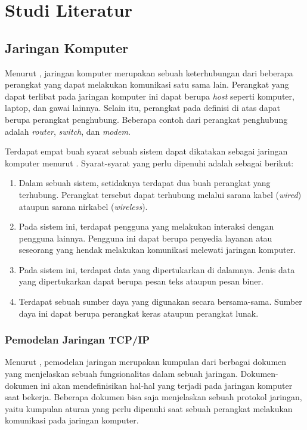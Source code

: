 \chapter{Studi Literatur}

\section{Jaringan Komputer}
\label{sec:jaringan-komputer}

Menurut \textcite{forouzan2012}, jaringan komputer merupakan sebuah keterhubungan dari beberapa perangkat yang dapat melakukan komunikasi satu sama lain. Perangkat yang dapat terlibat pada jaringan komputer ini dapat berupa \emph{host} seperti komputer, laptop, dan gawai lainnya. Selain itu, perangkat pada definisi di atas dapat berupa perangkat penghubung. Beberapa contoh dari perangkat penghubung adalah \emph{router}, \emph{switch}, dan \emph{modem}.

Terdapat empat buah syarat sebuah sistem dapat dikatakan sebagai jaringan komputer menurut \textcite{pratama2015}. Syarat-syarat yang perlu dipenuhi adalah sebagai berikut:
\begin{enumerate}
  \item Dalam sebuah sistem, setidaknya terdapat dua buah perangkat yang terhubung. Perangkat tersebut dapat terhubung melalui sarana kabel (\emph{wired}) ataupun sarana nirkabel (\emph{wireless}).
  \item Pada sistem ini, terdapat pengguna yang melakukan interaksi dengan pengguna lainnya. Pengguna ini dapat berupa penyedia layanan atau seseorang yang hendak melakukan komunikasi melewati jaringan komputer.
  \item Pada sistem ini, terdapat data yang dipertukarkan di dalamnya. Jenis data yang dipertukarkan dapat berupa pesan teks ataupun pesan biner.
  \item Terdapat sebuah sumber daya yang digunakan secara bersama-sama. Sumber daya ini dapat berupa perangkat keras ataupun perangkat lunak.
\end{enumerate}

\subsection{Pemodelan Jaringan TCP/IP}
Menurut \textcite{odom2022}, pemodelan jaringan merupakan kumpulan dari berbagai dokumen yang menjelaskan sebuah fungsionalitas dalam sebuah jaringan. Dokumen-dokumen ini akan mendefinisikan hal-hal yang terjadi pada jaringan komputer saat bekerja. Beberapa dokumen bisa saja menjelaskan sebuah protokol jaringan, yaitu kumpulan aturan yang perlu dipenuhi saat sebuah perangkat melakukan komunikasi pada jaringan komputer.

